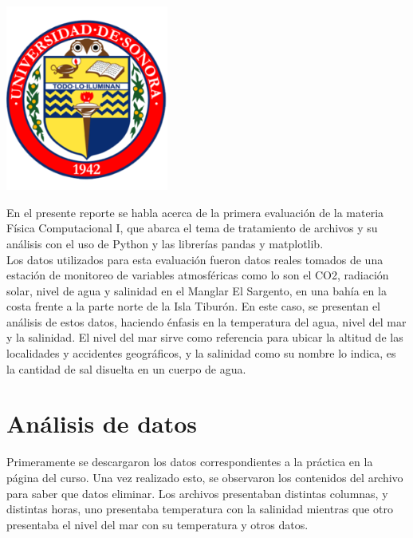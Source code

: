 \documentclass[12pt]{article}
\begin{document}
\begin{titlepage}
\includegraphics[width=0.4\textwidth]{logo.png}\\
 

\vfill %

\end{titlepage}

En el presente reporte se habla acerca de la primera evaluación de la materia Física Computacional I, que abarca el tema de tratamiento de archivos y su análisis con el uso de Python y las librerías pandas y matplotlib.  \\

Los datos utilizados para esta evaluación fueron datos reales tomados de una estación de monitoreo de variables atmosféricas como lo son el CO2, radiación solar, nivel de agua y salinidad en el Manglar El Sargento, en una bahía en la costa frente a la parte norte de la Isla Tiburón. En este caso, se presentan el análisis de estos datos, haciendo énfasis en la temperatura del agua, nivel del mar y la salinidad. El nivel del mar sirve como referencia para ubicar la altitud de las localidades y accidentes geográficos, y la salinidad como su nombre lo indica, es la cantidad de sal disuelta en un cuerpo de agua. 

\section{Análisis de datos}
Primeramente se descargaron los datos correspondientes a la práctica en la página del curso. Una vez realizado esto, se observaron los contenidos del archivo para saber que datos eliminar. Los archivos presentaban distintas columnas, y distintas horas, uno presentaba temperatura con la salinidad mientras que otro presentaba el nivel del mar con su temperatura y otros datos. \\
\end{document}
